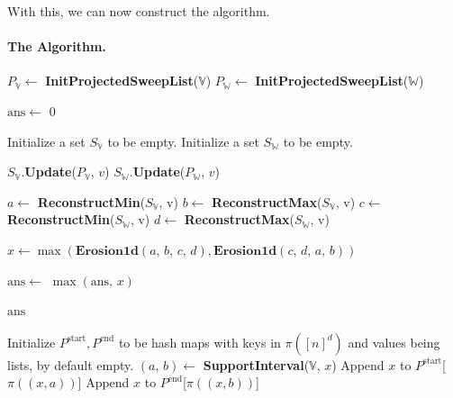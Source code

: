 \documentclass[a4paper,UKenglish,thm-restate]{article}
\theoremstyle{definition}
\begin{document}
            With this, we can now construct the algorithm.
            \paragraph*{The Algorithm.}
                \begin{algorithmic} \label{alg:dEalgo}

                    \State \( P_\mathbb{V} \gets \) \textbf{InitProjectedSweepList}($\mathbb{V}$)
                    \State \( P_\mathbb{W} \gets \) \textbf{InitProjectedSweepList}($\mathbb{W}$)
                    
                    \State \( \mathrm{ans} \gets \) \( 0 \)

                        \State Initialize a set $S_\mathbb{V}$ to be empty.
                        \State Initialize a set $S_\mathbb{W}$ to be empty.
                        
                         

                            \State $S_\mathbb{V}$.\textbf{Update}($P_\mathbb{V}$, $v$)
                            \State $S_\mathbb{W}$.\textbf{Update}($P_\mathbb{W}$, $v$)
    
                            \State  \( a \gets \) \textbf{ReconstructMin}(\( S_\mathbb{V} \), v)
                            \State \( b \gets \) \textbf{ReconstructMax}(\( S_\mathbb{V} \), v)
                            \State \( c \gets \) \textbf{ReconstructMin}(\( S_\mathbb{W} \), v)
                            \State \( d \gets \) \textbf{ReconstructMax}(\( S_\mathbb{W} \), v)
                            
                            \State \( x \gets \max (\textbf{Erosion1d}(a,\,b,\,c,\,d), \textbf{Erosion1d}(c,\,d,\,a,\,b) ) \)
                            
                            \State \( \mathrm{ans} \gets \) \( \max(\mathrm{ans},\,x) \)
                            
                        \EndFor
                    \EndFor

                    \State \Return \( \mathrm{ans} \)

                    \EndFunction

                    \State
                        \State Initialize $P^{\mathrm{start}}, P^{\mathrm{end}}$ to be hash maps with keys in $\pi([n]^d)$ and values being lists, by default empty.
                            \State \( (a,\,b) \gets \) \textbf{SupportInterval}($\mathbb{V}$, $x$)
                            \State Append $x$ to $P^{\mathrm{start}}$[$\pi((x, a))$]
                            \State Append $x$ to $P^{\mathrm{end}}$[$\pi((x, b))$]
   

\end{algorithmic}
\end{document}
